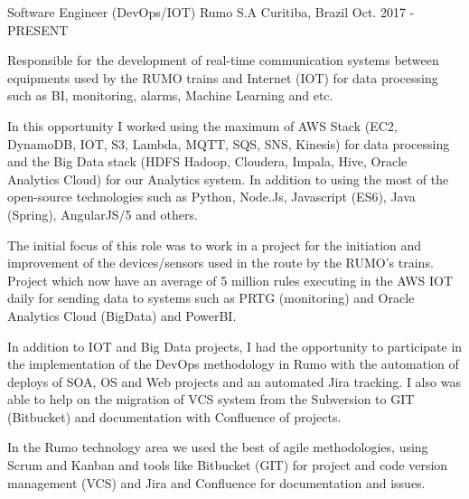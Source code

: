 

\begin{cventries}
  \cventry
    { Software Engineer (DevOps/IOT)} %
    {Rumo S.A} %
    {Curitiba, Brazil} %
    {Oct. 2017 - PRESENT} %
    {
    \begin{cvitems} %
        \item {
Responsible for the development of real-time communication systems between equipments used by the RUMO trains and Internet (IOT) for data processing such as BI, monitoring, alarms, Machine Learning and etc.
}
       \item {In this opportunity I worked using the maximum of AWS Stack (EC2, DynamoDB, IOT, S3, Lambda, MQTT, SQS, SNS, Kinesis) for data processing and the Big Data stack (HDFS Hadoop, Cloudera, Impala, Hive, Oracle Analytics Cloud) for our Analytics system. In addition to using the most of the open-source technologies such as Python, Node.Js, Javascript (ES6), Java (Spring), AngularJS/5 and others.}
        \item {The initial focus of this role was to work in a project for the initiation and improvement of the devices/sensors used in the route by the RUMO's trains. Project which now have an average of 5 million rules executing in the AWS IOT daily for sending data to systems such as PRTG (monitoring) and Oracle Analytics Cloud (BigData) and PowerBI.}
          \item {In addition to IOT and Big Data projects, I had the opportunity to participate in the implementation of the DevOps methodology in Rumo with the automation of deploys of SOA, OS and Web projects and an automated Jira tracking. I also was able to help on the migration of VCS system from the Subversion to GIT (Bitbucket) and documentation with Confluence of projects.}
        \item {In the Rumo technology area we used the best of agile methodologies, using Scrum and Kanban and tools like Bitbucket (GIT) for project and code version management (VCS) and Jira and Confluence for documentation and issues.}

\end{cvitems}}
\end{cventries}
